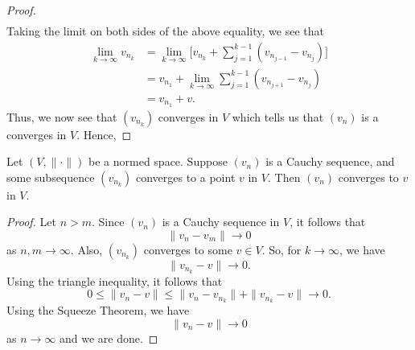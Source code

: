 \documentclass[a4paper]{article}
\begin{document}
\begin{proof}
\begin{align*}
\end{align*}
Taking the limit on both sides of the above equality, we see that 
\begin{align*}
    \lim_{ k  \to \infty  }  {v}_{{n}_{k}} &= \lim_{ k  \to \infty  }  \Big[ {v}_{{n}_{k }} + \sum_{ j=1  }^{ k - 1  } ({v}_{{n}_{j-1}} - {v}_{{n}_{j}})\Big]  \\
                                           &= {v}_{{n}_{1}} + \lim_{ k  \to \infty  }  \sum_{ j=1  }^{ k-1  } ({v}_{{n}_{j+1}} - {v}_{{n}_{j}}) \\
                                           &= {v}_{{n}_{1}} + v.
\end{align*}
Thus, we now see that \( ({v}_{{n}_{k}}) \) converges in \( V  \) which tells us that \( ({v}_{n}) \) is a converges in \( V  \). Hence, 
\end{proof}

\begin{lemma}\label{lemma}
   Let \( (V, \|\cdot\|) \) be a normed space. Suppose \( ({v}_{n}) \) is a Cauchy sequence, and some subsequence \( ({v}_{{n}_{k}}) \) converges to a point \( v  \) in \( V  \). Then \( ({v}_{n}) \) converges to \( v  \) in \( V  \).   
\end{lemma}
\begin{proof}
Let \( n > m  \). Since \( ({v}_{n}) \) is a Cauchy sequence in \( V  \), it follows that 
\[  \|{v}_{n} - {v}_{m} \| \to 0  \]
as \( n,m \to \infty  \). Also, \( ({v}_{{n}_{k}}) \) converges to some \( v \in V  \). So, for \( k \to \infty  \), we have 
\[  \|{v}_{{n}_{k}} - v \| \to 0. \]
Using the triangle inequality, it follows that 
\[  0 \leq \|{v}_{n} - v \| \leq \|{v}_{n} - {v}_{{n}_{k}} \| + \|{v}_{{n}_{k }} - v \| \to 0.  \]
Using the Squeeze Theorem, we have 
\[  \|{v}_{n} - v \| \to 0  \]
as \( n \to \infty  \) and we are done.
\end{proof}
\end{document}
